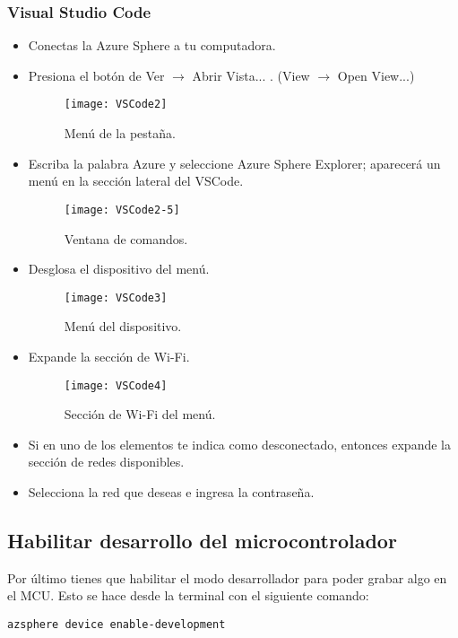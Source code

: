 \subsubsection{Visual Studio Code}
\begin{itemize}
	\item
	Conectas la Azure Sphere a tu computadora.
	\item 
	Presiona el botón de Ver $\rightarrow$ Abrir Vista... . (View $\rightarrow$ Open View...)
	\begin{figure}[h]
	\centering
	\texttt{[image: VSCode2]}
	\caption{Menú de la pestaña.}
	\end{figure}
	\item 
	Escriba la palabra Azure y seleccione Azure Sphere Explorer; aparecerá un menú en la sección lateral del VSCode.  
	\begin{figure}[h]
	\centering
	\texttt{[image: VSCode2-5]}
	\caption{Ventana de comandos.}
	\end{figure}
	\pagebreak
	\item 
	Desglosa el dispositivo del menú. 
	\begin{figure}[h]
	\centering
	\texttt{[image: VSCode3]}
	\caption{Menú del dispositivo.}
	\end{figure}
	\item 
	Expande la sección de Wi-Fi.
	\begin{figure}[h]
	\centering
	\texttt{[image: VSCode4]}
	\caption{Sección de Wi-Fi del menú.}
	\end{figure}
	\item 
	Si en uno de los elementos te indica como desconectado, entonces expande la sección de redes disponibles.
	\item 
	Selecciona la red que deseas e ingresa la contraseña.
\end{itemize}

\subsection{Habilitar desarrollo del microcontrolador}
Por último tienes que habilitar el modo desarrollador para poder grabar algo en el MCU. Esto se hace desde la terminal con el siguiente comando:
\begin{verbatim}
azsphere device enable-development
\end{verbatim}

